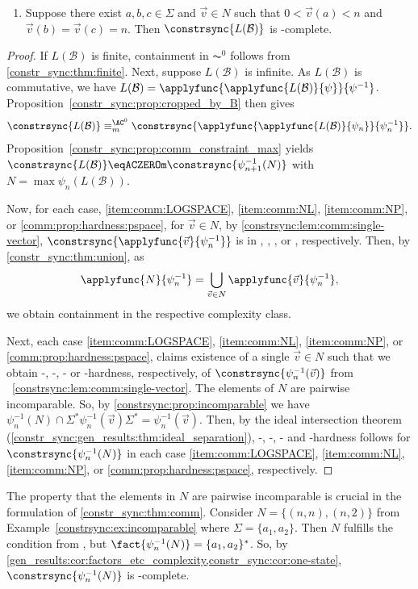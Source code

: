 \begin{theorem}
\begin{enumerate}
		
		\item \label{comm:prop:hardness:pspace}  Suppose there exist $a,b,c \in \Sigma$ and $\vec{v} \in N$
		such that $0 < \vec{v}(a) < n$
		and $\vec{v}(b) = \vec{v}(c) = n$.
		Then $\constrsync{L(\mathcal B)}$ %
	    is \PSPACE-complete.
	\end{enumerate}
\end{theorem}
\begin{proof} 
If $L(\mathcal B)$ is finite, containment in $\AC^0$
follows from \cref{constr_sync:thm:finite}.
Next, suppose $L(\mathcal B)$ is infinite.
As $L(\mathcal B)$ is commutative,
we have $L(\mathcal B) = \applyfunc{\applyfunc{L(\mathcal B)}{\psi}}{\psi^{-1}}$.
Proposition~\ref{constr_sync:prop:cropped_by_B} then gives
\[
\constrsync{L(\mathcal B)} \equiv_m^{\AC^0}
\constrsync{\applyfunc{
		\applyfunc{L(\mathcal B)}{\psi_{n}}}{\psi_{n}^{-1}}
}.
\]
Proposition~\ref{constr_sync:prop:comm_constraint_max} 
yields $\constrsync{L(\mathcal B)} \eqACZEROm \constrsync{\psi_{n+1}^{-1}(N)}$
with $N = \max \psi_n(L(\mathcal B))$.

Now, for each case, \ref{item:comm:LOGSPACE}, \ref{item:comm:NL}, \ref{item:comm:NP}, or \ref{comm:prop:hardness:pspace},
for $\vec{v} \in N$, by \cref{constrsync:lem:comm:single-vector},
$\constrsync{\applyfunc{\vec{v}}{\psi_n^{-1}}}$ is in \LOGSPACE, \NL, \NP, or \PSPACE, respectively.
 Then, by \cref{constr_sync:thm:union},
as
\[
\applyfunc{N}{\psi_n^{-1}}
= \bigcup_{\vec{v} \in N} \applyfunc{\vec{v}}{\psi_n^{-1}},
\]
we obtain containment in the respective complexity class.

Next, each case \ref{item:comm:LOGSPACE}, \ref{item:comm:NL}, \ref{item:comm:NP}, or \ref{comm:prop:hardness:pspace},
claims existence of a single $\vec{v} \in N$
such that we obtain \LOGSPACE-, \NL-, \NP- or \PSPACE-hardness, respectively,
of  $\constrsync{\psi_n^{-1}(\vec{v})}$ from \LEM~\ref{constrsync:lem:comm:single-vector}. 
The elements of $N$ are pairwise incomparable.
So, by \cref{constrsync:prop:incomparable} 
we have $\psi_n^{-1}(N) \cap \Sigma^* \psi_n^{-1}(\vec{v}) \Sigma^* = \psi_n^{-1}(\vec{v})$.
Then, by the ideal intersection theorem (\cref{constr_sync:gen_results:thm:ideal_separation}),
\LOGSPACE-, \NL-, \NP-  and \PSPACE-hardness
follows for $\constrsync{\psi_n^{-1}(N)}$
in each case \ref{item:comm:LOGSPACE}, \ref{item:comm:NL}, \ref{item:comm:NP}, or \ref{comm:prop:hardness:pspace}, respectively.
\end{proof}

\begin{remark}
The property that the elements in $N$ are pairwise incomparable
is crucial in the formulation of \cref{constr_sync:thm:comm}. 
Consider $N = \{(n,n), (n,2)\}$ from Example~\ref{constrsync:ex:incomparable}  where $\Sigma = \{a_1, a_2\}$.
Then $N$ fulfills the condition from ,
but $\fact{\psi_n^{-1}(N)} = \{a_1, a_2\}^*$.
So, by \cref{gen_results:cor:factors_etc_complexity,constr_sync:cor:one-state},
$\constrsync{\psi_n^{-1}(N)}$ is \NL-complete.
\end{remark}

